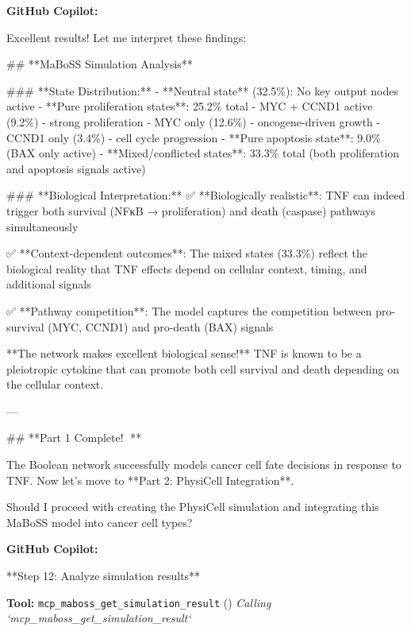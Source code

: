 \documentclass[11pt,a4paper]{article}
\begin{document}
\begin{copilotbox}
\textbf{GitHub Copilot:}

Excellent results! Let me interpret these findings:

\#\# **MaBoSS Simulation Analysis**

\#\#\# **State Distribution:**
- **Neutral state** (32.5\%): No key output nodes active
- **Pure proliferation states**: 25.2\% total
  - MYC + CCND1 active (9.2\%) - strong proliferation  
  - MYC only (12.6\%) - oncogene-driven growth
  - CCND1 only (3.4\%) - cell cycle progression
- **Pure apoptosis state**: 9.0\% (BAX only active)
- **Mixed/conflicted states**: 33.3\% total (both proliferation and apoptosis signals active)

\#\#\# **Biological Interpretation:**
✅ **Biologically realistic**: TNF can indeed trigger both survival (NFκB → proliferation) and death (caspase) pathways simultaneously

✅ **Context-dependent outcomes**: The mixed states (33.3\%) reflect the biological reality that TNF effects depend on cellular context, timing, and additional signals

✅ **Pathway competition**: The model captures the competition between pro-survival (MYC, CCND1) and pro-death (BAX) signals

**The network makes excellent biological sense!** TNF is known to be a pleiotropic cytokine that can promote both cell survival and death depending on the cellular context.

---

\#\# **Part 1 Complete! 🎉**

The Boolean network successfully models cancer cell fate decisions in response to TNF. Now let's move to **Part 2: PhysiCell Integration**.

Should I proceed with creating the PhysiCell simulation and integrating this MaBoSS model into cancer cell types?

\end{copilotbox}
\begin{copilotbox}
\textbf{GitHub Copilot:}

**Step 12: Analyze simulation results**

\end{copilotbox}
\begin{toolokbox}
\textbf{Tool:} \texttt{mcp\_maboss\_get\_simulation\_result} (\checkmark)
\textit{Calling `mcp\_maboss\_get\_simulation\_result`}
\end{toolokbox}
\end{document}
